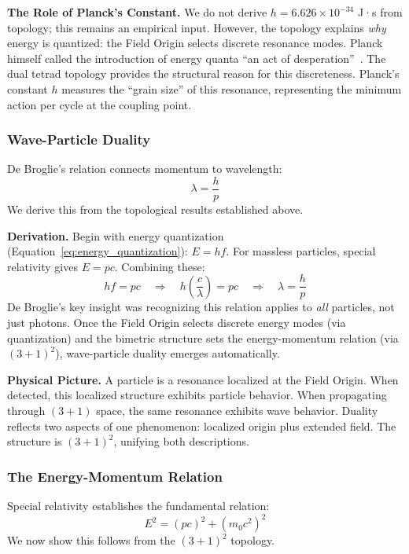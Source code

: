 \documentclass[aps,prd,preprint,superscriptaddress,showpacs,preprintnumbers,amsmath,amssymb,nofootinbib]{revtex4-2}
\begin{document}
\textbf{The Role of Planck's Constant.}
We do not derive $h = 6.626 \times 10^{-34}$ J·s from topology; this remains an empirical input. However, the topology explains \emph{why} energy is quantized: the Field Origin selects discrete resonance modes. Planck himself called the introduction of energy quanta ``an act of desperation''~\cite{planck1931}. The dual tetrad topology provides the structural reason for this discreteness. Planck's constant $h$ measures the ``grain size'' of this resonance, representing the minimum action per cycle at the coupling point.

\subsubsection*{Wave-Particle Duality}

De Broglie's relation connects momentum to wavelength:
\begin{equation}
\lambda = \frac{h}{p}
\label{eq:debroglie}
\end{equation}
We derive this from the topological results established above.

\textbf{Derivation.}
Begin with energy quantization (Equation~\ref{eq:energy_quantization}): $E = hf$. For massless particles, special relativity gives $E = pc$. Combining these:
\begin{equation}
hf = pc \quad \Rightarrow \quad h\left(\frac{c}{\lambda}\right) = pc \quad \Rightarrow \quad \lambda = \frac{h}{p}
\end{equation}
De Broglie's key insight was recognizing this relation applies to \emph{all} particles, not just photons. Once the Field Origin selects discrete energy modes (via quantization) and the bimetric structure sets the energy-momentum relation (via $(3+1)^2$), wave-particle duality emerges automatically.

\textbf{Physical Picture.}
A particle is a resonance localized at the Field Origin. When detected, this localized structure exhibits particle behavior. When propagating through $(3+1)$ space, the same resonance exhibits wave behavior. Duality reflects two aspects of one phenomenon: localized origin plus extended field. The structure is $(3+1)^2$, unifying both descriptions.

\subsubsection*{The Energy-Momentum Relation}

Special relativity establishes the fundamental relation:
\begin{equation}
E^2 = (pc)^2 + (m_0 c^2)^2
\label{eq:energy_momentum}
\end{equation}
We now show this follows from the $(3+1)^2$ topology.
\end{document}
